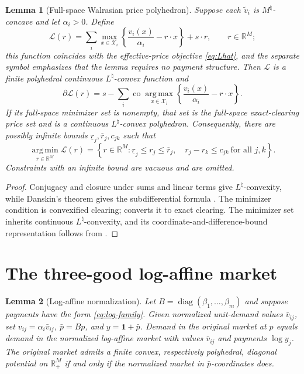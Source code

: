 \documentclass[11pt,a4paper,fleqn]{article}
\theoremstyle{plain}
\newtheorem{lemma}{Lemma}[section]
\theoremstyle{definition}
\newcommand{\R}{\mathbb{R}}
\newcommand{\co}{\operatorname{co}}
\newcommand{\argmin}{\operatorname*{arg\,min}}
\newcommand{\argmax}{\operatorname*{arg\,max}}
\newcommand{\diag}{\operatorname{diag}}
\newcommand{\Xcal}{\mathcal{X}}
\newcommand{\one}{\mathbf{1}}
\begin{document}
\begin{lemma}[Full-space Walrasian price polyhedron]\label{lem:walrasian-price-polyhedron}
Suppose each $\widetilde v_i$ is $M^\natural$-concave and let $\alpha_i>0$. Define
\[
\mathcal L(r)=
\sum_i\max_{x\in\Xcal_i}
\left\{\frac{v_i(x)}{\alpha_i}-r\cdot x\right\}
+s\cdot r,
\qquad r\in\R^M;
\]
this function coincides with the effective-price objective \eqref{eq:Lhat}, and the separate symbol emphasizes that the lemma requires no payment structure. Then $\mathcal L$ is a finite polyhedral continuous $L^\natural$-convex function and
\[
\partial\mathcal L(r)
=s-\sum_i\co\argmax_{x\in\Xcal_i}
\left\{\frac{v_i(x)}{\alpha_i}-r\cdot x\right\}.
\]
If its full-space minimizer set is nonempty, that set is the full-space exact-clearing price set and is a continuous $L^\natural$-convex polyhedron. Consequently, there are possibly infinite bounds $\underline r_j,\overline r_j,c_{jk}$ such that
\[
\argmin_{r\in\R^M}\mathcal L(r)=
\left\{r\in\R^M:
\underline r_j\le r_j\le\overline r_j,
\quad r_j-r_k\le c_{jk}\ \text{for all }j,k
\right\}.
\]
Constraints with an infinite bound are vacuous and are omitted.
\end{lemma}

\begin{proof}
Conjugacy and closure under sums and linear terms give $L^\natural$-convexity, while Danskin's theorem gives the subdifferential formula \citep[Theorems~7.10 and 8.2]{murota2016}. The minimizer condition is convexified clearing;  converts it to exact clearing. The minimizer set inherits continuous $L^\natural$-convexity, and its coordinate-and-difference-bound representation follows from \citet[Theorem~2.2(2)]{moriguchimurota2023}.
\end{proof}

\section{The three-good log-affine market}\label{app:facets}

\begin{lemma}[Log-affine normalization]\label{lem:log-normalization}
Let $B=\diag(\beta_1,\ldots,\beta_m)$ and suppose payments have the form \eqref{eq:log-family}. Given normalized unit-demand values $\bar v_{ij}$, set $v_{ij}=\alpha_i\bar v_{ij}$, $\bar p=Bp$, and $y=\one+\bar p$. Demand in the original market at $p$ equals demand in the normalized log-affine market with values $\bar v_{ij}$ and payments $\log y_j$. The original market admits a finite convex, respectively polyhedral, diagonal potential on $\R_+^M$ if and only if the normalized market in $\bar p$-coordinates does.
\end{lemma}
\end{document}
